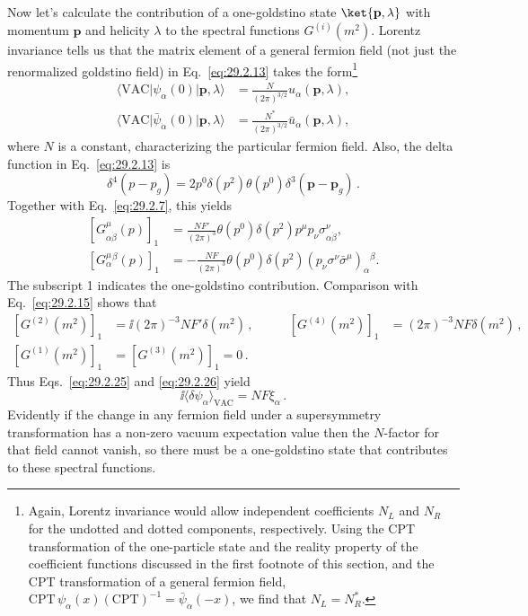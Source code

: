 Now let's calculate the contribution of a one-goldstino state
\(\ket{\mathbf p,\lambda}\) with momentum \(\mathbf p\) and
helicity \(\lambda\) to the spectral functions \(G^{(i)}(m^2)\). Lorentz
invariance tells us that the matrix element of a general fermion field
(not just the renormalized goldstino field) in Eq.~\eqref{eq:29.2.13}
takes the form\footnote{Again, Lorentz invariance would allow independent
coefficients \(N_L\) and \(N_R\) for the undotted and dotted components,
respectively. Using the CPT transformation of the
one-particle state and the reality property of the coefficient functions
discussed in the first footnote of this section, and the CPT
transformation of a general fermion field,
\(\mathrm{CPT}\,\psi_\alpha(x)(\mathrm{CPT})^{-1}
=\bar\psi_{\dot\alpha}(-x)\), we find that \(N_L=N_R^*\).}
\begin{equation}
  \begin{aligned}
  \langle\mathrm{VAC}\lvert\psi_\alpha(0)
    \rvert\mathbf p,\lambda\rangle
  &=\frac{N}{(2\pi)^{3/2}}u_\alpha(\mathbf p,\lambda),
  \\
  \langle\mathrm{VAC}\lvert\bar\psi_{\dot\alpha}(0)
    \rvert\mathbf p,\lambda\rangle
  &=\frac{N^*}{(2\pi)^{3/2}}
    \bar u_{\dot\alpha}(\mathbf p,\lambda),
  \end{aligned}
  \tag{29.2.27}\label{eq:29.2.27}
\end{equation}
where \(N\) is a constant, characterizing the particular fermion field.
Also, the delta function in Eq.~\eqref{eq:29.2.13} is
\[
  \delta^4(p-p_g)
  =2p^0\delta(p^2)\theta(p^0)
    \delta^3(\mathbf p-\mathbf p_g)\,.
\]
Together with Eq.~\eqref{eq:29.2.7}, this yields
\[
  \begin{aligned}
  \left[G^\mu_{\alpha\dot\beta}(p)\right]_1
  &=
  \frac{NF'}{(2\pi)^3}\theta(p^0)\delta(p^2)
    p^\mu p_\nu\sigma^\nu_{\alpha\dot\beta},
  \\
  \left[G^\mu_\alpha{}^\beta(p)\right]_1
  &=
  -\frac{NF}{(2\pi)^3}\theta(p^0)\delta(p^2)
    (p_\nu\sigma^\nu\bar\sigma^\mu)_\alpha{}^\beta .
  \end{aligned}
\]
The subscript 1 indicates the one-goldstino contribution. Comparison with
Eq.~\eqref{eq:29.2.15} shows that
\begin{equation}
  \begin{aligned}
  \left[G^{(2)}(m^2)\right]_1
  &=\ii(2\pi)^{-3}NF'\delta(m^2)\,,
  &\qquad
  \left[G^{(4)}(m^2)\right]_1
  &=(2\pi)^{-3}NF\delta(m^2)\,,
  \\
  \left[G^{(1)}(m^2)\right]_1
  &=\left[G^{(3)}(m^2)\right]_1=0\,.
  \end{aligned}
  \tag{29.2.28}\label{eq:29.2.28}
\end{equation}
Thus Eqs.~\eqref{eq:29.2.25} and \eqref{eq:29.2.26} yield
\begin{equation}
  \ii\langle\delta\psi_\alpha\rangle_{\mathrm{VAC}}
  =NF\xi_\alpha\,.
  \tag{29.2.29}\label{eq:29.2.29}
\end{equation}
Evidently if the change in any fermion field under a supersymmetry
transformation has a non-zero vacuum expectation value then the
\(N\)-factor for that field cannot vanish, so there must be a
one-goldstino state that contributes to these spectral functions.

